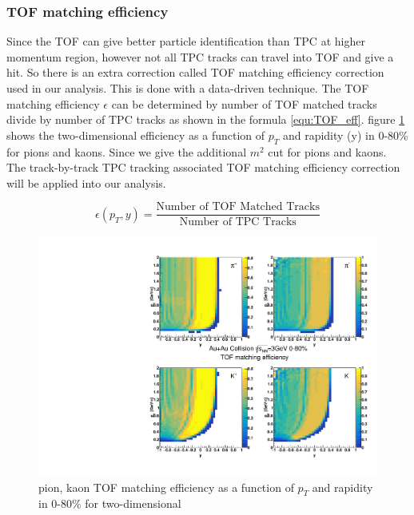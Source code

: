 \subsubsection{TOF matching efficiency}

Since the TOF can give better particle identification than TPC at higher momentum region, however not all TPC tracks can travel into TOF and give a hit. So there is an extra correction called TOF matching efficiency correction used in our analysis. This is done with a data-driven technique. The TOF matching efficiency $\epsilon$ can be determined by number of TOF matched tracks divide by number of TPC tracks as shown in the formula \ref{equ:TOF_eff}. 
figure \ref{fig:pik_eff_tof} shows the two-dimensional efficiency as a function of $p_{T}$ and rapidity (y) in 0-80\% for pions and kaons. Since we give the additional $m^{2}$ cut for pions and kaons.
The track-by-track TPC tracking associated TOF matching efficiency correction will be applied into our analysis.

\begin{equation}
    \epsilon (p_{T}, y) = \frac{\text{Number of TOF Matched Tracks}}{\text{Number of TPC Tracks}}
    \label{equ:TOF_eff}
\end{equation}

\begin{figure}
    \centering
    \includegraphics[scale=0.5]{FXT3gev/chapter2/fig/eff/pik_tofeff.pdf}
    \caption{pion, kaon TOF matching efficiency as a function of $p_{T}$ and rapidity in 0-80\% for two-dimensional}
    \label{fig:pik_eff_tof}
\end{figure}

